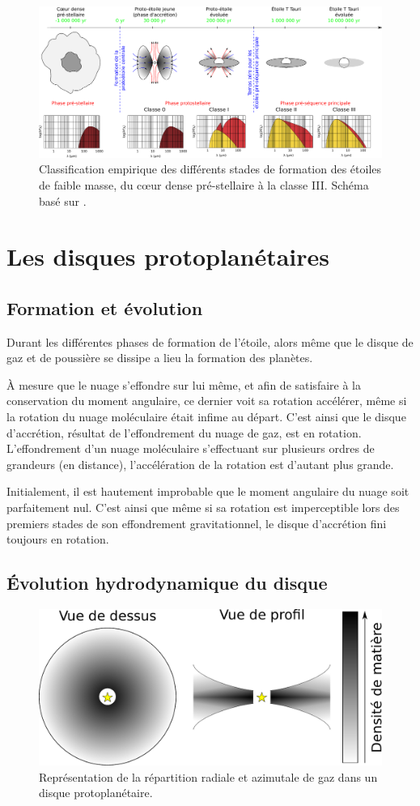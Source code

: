 \begin{figure}[htb]
\centering
\includegraphics[width=0.45\linewidth]{figure/star_formation.pdf}
\caption{Classification empirique des différents stades de formation des étoiles de faible masse, du cœur dense pré-stellaire à la classe III. Schéma basé sur \citep{andre2002initial}. }\label{fig:star_formation}
\end{figure}


\section{Les disques protoplanétaires}


\subsection{Formation et évolution}
Durant les différentes phases de formation de l'étoile, alors même que le disque de gaz et de poussière se dissipe a lieu la formation des planètes. 

À mesure que le nuage s'effondre sur lui même, et afin de satisfaire à la conservation du moment angulaire, ce dernier voit sa rotation accélérer, même si la rotation du nuage moléculaire était infime au départ. C'est ainsi que le disque d'accrétion, résultat de l'effondrement du nuage de gaz, est en rotation. L'effondrement d'un nuage moléculaire s'effectuant sur plusieurs ordres de grandeurs (en distance), l'accélération de la rotation est d'autant plus grande.

Initialement, il est hautement improbable que le moment angulaire du nuage soit parfaitement nul. C'est ainsi que même si sa rotation est imperceptible lors des premiers stades de son effondrement gravitationnel, le disque d'accrétion fini toujours en rotation. 

\subsection{Évolution hydrodynamique du disque}
\begin{figure}[htb]
\centering
\includegraphics[width=0.45\linewidth]{figure/disk_scheme.pdf}
\caption{Représentation de la répartition radiale et azimutale de gaz dans un disque protoplanétaire.}\label{fig:disk_scheme}
\end{figure}

